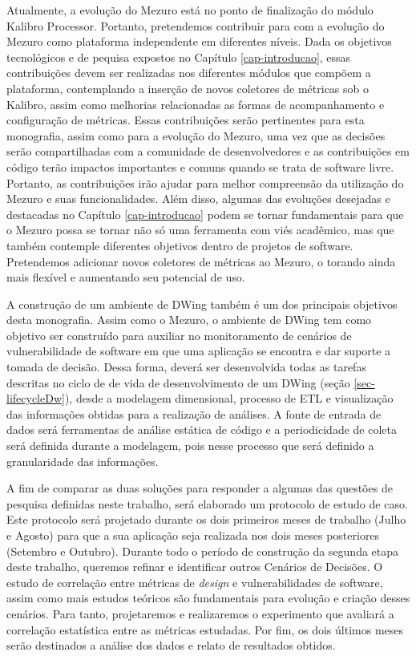 %

Atualmente, a evolução do Mezuro está no ponto de finalização do módulo Kalibro Processor. Portanto, pretendemos contribuir para com a evolução do Mezuro como plataforma independente em diferentes níveis. Dada os objetivos tecnológicos e de pequisa expostos no Capítulo \ref{cap-introducao}, essas contribuições devem ser realizadas nos diferentes módulos que compõem a plataforma, contemplando a inserção de novos coletores de métricas sob o Kalibro, assim como melhorias relacionadas as formas de acompanhamento e configuração de métricas. Essas contribuições serão pertinentes para esta monografia, assim como para a evolução do Mezuro, uma vez que as decisões serão compartilhadas com a comunidade de desenvolvedores e as contribuições em código terão impactos importantes e comuns quando se trata de software livre. Portanto, as contribuições irão ajudar para melhor compreensão da utilização do Mezuro e suas funcionalidades. Além disso, algumas das evoluções desejadas e destacadas no Capítulo \ref{cap-introducao} podem se tornar fundamentais para que o Mezuro possa se tornar não só uma ferramenta com viés acadêmico, mas que também contemple diferentes objetivos dentro de projetos de software. Pretendemos adicionar novos coletores de métricas ao Mezuro, o torando ainda mais flexível e aumentando seu potencial de uso.

%

A construção de um ambiente de DWing também é um dos principais objetivos desta monografia. Assim como o Mezuro, o ambiente de DWing tem como objetivo ser construído para auxiliar no monitoramento de cenários de vulnerabilidade de software em que uma aplicação se encontra e dar suporte a tomada de decisão. Dessa forma, deverá ser desenvolvida todas as tarefas descritas no ciclo de de vida de desenvolvimento de um DWing (seção \ref{sec-lifecycleDw}), desde a modelagem dimensional, processo de ETL e visualização das informações obtidas para a realização de análises. A fonte de entrada de dados será ferramentas de análise estática de código e a periodicidade de coleta será definida durante a modelagem, pois nesse processo que será definido a granularidade das informações.

%

A fim de comparar as duas soluções para responder a algumas das questões de pesquisa definidas neste trabalho, será elaborado um protocolo de estudo de caso. Este protocolo será projetado durante os dois primeiros meses de trabalho (Julho e Agosto) para que a sua aplicação seja realizada nos dois meses posteriores (Setembro e Outubro).
%
Durante todo o período de construção da segunda etapa deste trabalho, queremos refinar e identificar outros Cenários de Decisões. O estudo de correlação entre métricas de \emph{design} e vulnerabilidades de software, assim como mais estudos teóricos são fundamentais para evolução e criação desses cenários. Para tanto, projetaremos e realizaremos o experimento que avaliará a correlação estatística entre as métricas estudadas. Por fim, os dois últimos meses serão destinados a análise dos dados e relato de resultados obtidos. 
	
